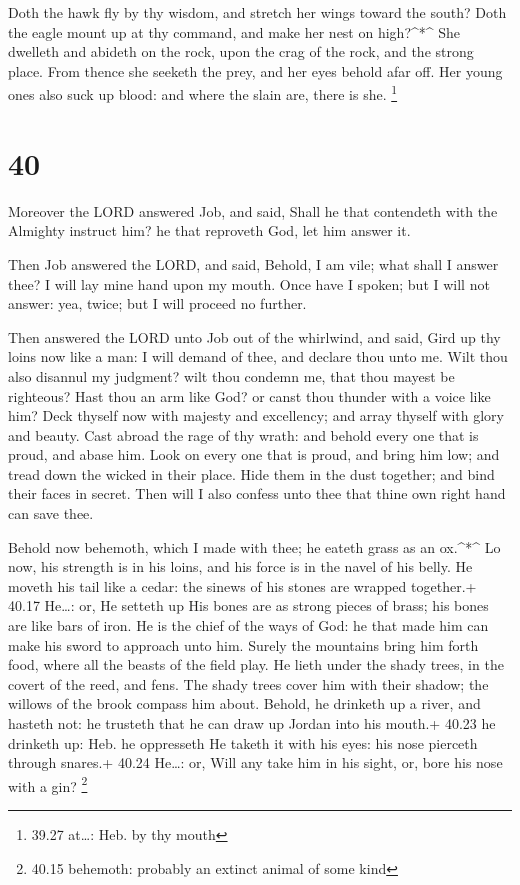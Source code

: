  Doth the hawk fly by thy wisdom, and stretch her wings
toward the south?  Doth the eagle mount up at thy command,
and make her nest on high?\^{}*\^{}  She dwelleth and
abideth on the rock, upon the crag of the rock, and the strong place.
 From thence she seeketh the prey, and her eyes behold afar
off.  Her young ones also suck up blood: and where the
slain are, there is she. \footnote{39.27 at\ldots: Heb. by thy mouth}

\hypertarget{section-39}{%
\section{40}\label{section-39}}

 Moreover the LORD answered Job, and said, 
Shall he that contendeth with the Almighty instruct him? he that
reproveth God, let him answer it.

 Then Job answered the LORD, and said,  Behold,
I am vile; what shall I answer thee? I will lay mine hand upon my mouth.
 Once have I spoken; but I will not answer: yea, twice; but
I will proceed no further.

 Then answered the LORD unto Job out of the whirlwind, and
said,  Gird up thy loins now like a man: I will demand of
thee, and declare thou unto me.  Wilt thou also disannul my
judgment? wilt thou condemn me, that thou mayest be righteous?
 Hast thou an arm like God? or canst thou thunder with a
voice like him?  Deck thyself now with majesty and
excellency; and array thyself with glory and beauty.  Cast
abroad the rage of thy wrath: and behold every one that is proud, and
abase him.  Look on every one that is proud, and bring him
low; and tread down the wicked in their place.  Hide them
in the dust together; and bind their faces in secret.  Then
will I also confess unto thee that thine own right hand can save thee.

 Behold now behemoth, which I made with thee; he eateth
grass as an ox.\^{}*\^{}  Lo now, his strength is in his
loins, and his force is in the navel of his belly.  He
moveth his tail like a cedar: the sinews of his stones are wrapped
together.+ 40.17 He\ldots: or, He setteth up  His bones are
as strong pieces of brass; his bones are like bars of iron.
 He is the chief of the ways of God: he that made him can
make his sword to approach unto him.  Surely the mountains
bring him forth food, where all the beasts of the field play.
 He lieth under the shady trees, in the covert of the reed,
and fens.  The shady trees cover him with their shadow; the
willows of the brook compass him about.  Behold, he
drinketh up a river, and hasteth not: he trusteth that he can draw up
Jordan into his mouth.+ 40.23 he drinketh up: Heb. he oppresseth
 He taketh it with his eyes: his nose pierceth through
snares.+ 40.24 He\ldots: or, Will any take him in his sight, or, bore
his nose with a gin? \footnote{40.15 behemoth: probably an extinct
  animal of some kind}

